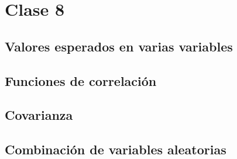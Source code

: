 \chapter{Clase 8}

\section{Valores esperados en varias variables}

\section{Funciones de correlación}

\section{Covarianza}

\section{Combinación de variables aleatorias}